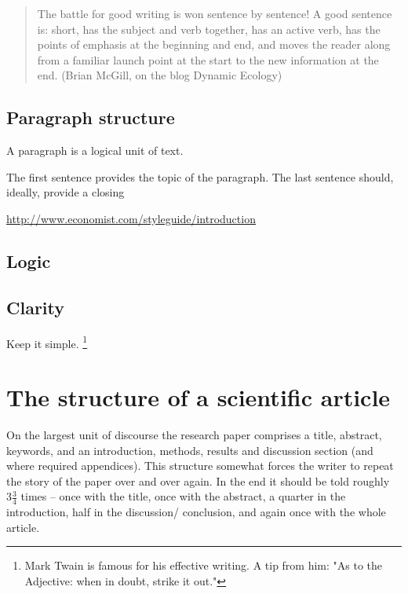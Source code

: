 \documentclass{tufte-book}
\begin{document}
\begin{quote}
The battle for good writing is won sentence by sentence! A good sentence is: short, has the subject and verb together, has an active verb, has the points of emphasis at the beginning and end, and moves the reader along from a familiar launch point at the start to the new information at the end. (Brian McGill, on the blog Dynamic Ecology)
\end{quote}



\subsection{Paragraph structure}

A paragraph is a logical unit of text. 

The first sentence provides the topic of the paragraph. The last sentence should, ideally, provide a closing 



\href{http://www.economist.com/styleguide/introduction}{http://www.economist.com/styleguide/introduction}




\subsection{Logic}


\subsection{Clarity}

Keep it simple. \footnote{Mark Twain is famous for his effective writing. A tip from him: "As to the Adjective: when in doubt, strike it out."}








\section{The structure of a scientific article}   
On the largest unit of discourse the research paper comprises a title, abstract, keywords, and an introduction, methods, results and discussion section (and where required appendices). 
This structure somewhat forces the writer to repeat the story of the paper over and over again. In the end  it should be told roughly $3\frac{3}{4}$ times -- once with the title, once with the abstract, a quarter in the introduction, half in the discussion/ conclusion, and again once with the whole article.
\end{document}
